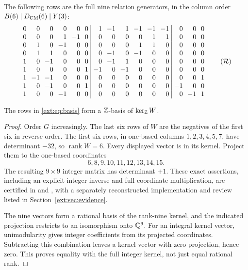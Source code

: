 The following rows are the full nine relation generators, in the column
order $B(6)\mid {\ensuremath{D_{\mathrm{CM}}}}(6)\mid Y(3)$:
\[
\setlength{\arraycolsep}{3.5pt}
\begin{array}{rrrrrr|rrrrrr|rrr}
0&0&0&0&0&0&1&-1&1&-1&-1&-1&0&0&0\\
0&0&0&1&-1&0&0&0&0&0&1&1&0&0&0\\
0&1&0&-1&0&0&0&0&0&1&1&0&0&0&0\\
0&1&1&0&0&0&0&-1&0&-1&0&0&0&0&0\\
1&0&-1&0&0&0&0&-1&1&0&0&0&0&0&0\\
1&0&0&0&0&1&-1&0&-1&0&0&0&0&0&0\\
1&-1&-1&0&0&0&0&0&0&0&0&0&0&0&1\\
1&0&-1&0&0&1&0&0&0&0&0&0&-1&0&0\\
1&0&0&-1&0&0&0&0&0&0&0&0&0&-1&1
\end{array}
\tag{$\mathcal R$}\label{ext:eq:basis}
\]
\begin{lemma}\label{ext:lem:lattice}
The rows in \eqref{ext:eq:basis} form a $\mathbb Z$-basis of $\ker_{\mathbb Z}W$.
\end{lemma}
\begin{proof}
Order $G$ increasingly. The last six rows of $W$ are the negatives of
the first six in reverse order. The first six rows, in one-based columns
$1,2,3,4,5,7$, have determinant $-32$, so $\operatorname{rank}W=6$.
Every displayed vector is in its kernel. Project them to the one-based
coordinates
\[
 6,8,9,10,11,12,13,14,15.
\]
The resulting $9\times9$ integer matrix has determinant $+1$.
These exact assertions, including an explicit integer inverse and full
coordinate multiplication, are certified in
 and
, with a separately
reconstructed implementation and review listed in
Section~\ref{ext:sec:evidence}.

The nine vectors form a rational basis of the rank-nine kernel, and
the indicated projection restricts to an isomorphism onto $\mathbb Q^9$.
For an integral kernel vector, unimodularity gives integer coefficients
from its projected coordinates. Subtracting this combination leaves a
kernel vector with zero projection, hence zero. This proves equality
with the full integer kernel, not just equal rational rank.
\end{proof}

